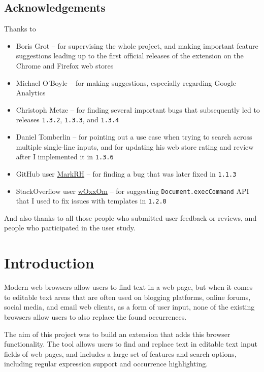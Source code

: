 \documentclass[bsc,frontabs,twoside,singlespacing,parskip,deptreport]{infthesis}
\begin{document}
\section*{Acknowledgements}
Thanks to
\begin{itemize}
\item
  Boris Grot -- for supervising the whole project, and making important feature suggestions leading up to the first official releases of the extension on the Chrome and Firefox web stores
\item
  Michael O'Boyle -- for making suggestions, especially regarding Google Analytics
\item
  Christoph Metze -- for finding several important bugs that subsequently led to releases \texttt{1.3.2}, \texttt{1.3.3}, and \texttt{1.3.4}
\item
  Daniel Tomberlin -- for pointing out a use case when trying to search across multiple single-line inputs, and for updating his web store rating and review after I implemented it in \texttt{1.3.6}
\item
  GitHub user \href{https://github.com/MarkRH}{MarkRH} -- for finding a bug that was later fixed in \texttt{1.1.3}
\item
  StackOverflow user \href{https://stackoverflow.com/users/3959875/woxxom}{wOxxOm} -- for suggesting \texttt{Document.execCommand} API that I used to fix issues with templates in \texttt{1.2.0}
\end{itemize}

And also thanks to all those people who submitted user feedback or
reviews, and people who participated in the user study.

\standarddeclaration

\tableofcontents
\listoffigures

\chapter{Introduction} %
Modern web browsers allow users to find text in a web page, but when it comes to editable text areas that are often used on blogging platforms, online forums, social media, and email web clients, as a form of user input, none of the existing browsers allow users to also replace the found occurrences.
 
The aim of this project was to build an extension that adds this browser functionality. The tool allows users to find and replace text in editable text input fields of web pages, and includes a large set of features and search options, including regular expression support and occurrence highlighting.
\end{document}

